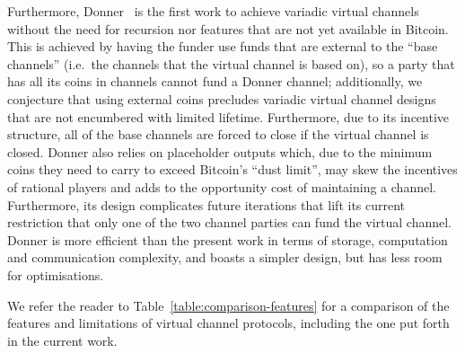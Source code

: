   Furthermore, Donner~\cite{donner} is the first work to achieve variadic
  virtual channels without the need for recursion nor features that are not yet
  available in Bitcoin. This is achieved by having the funder use funds that are
  external to the ``base channels'' (i.e.\ the channels that the virtual channel
  is based on), so a party that has all its coins in channels cannot fund a
  Donner channel; additionally, we conjecture that using external coins
  precludes variadic virtual channel designs that are not encumbered with
  limited lifetime. Furthermore, due to its incentive structure, all of the
  base channels are forced to close if the virtual channel is closed.
  Donner also relies on placeholder outputs
  which, due to the minimum coins they need to carry to exceed Bitcoin's ``dust
  limit'', may skew the incentives of rational players and adds to the
  opportunity cost of maintaining a channel. Furthermore, its design complicates
  future iterations that lift its current restriction that only one of the two
  channel parties can fund the virtual channel. Donner is more efficient than
  the present work in terms of storage, computation and communication
  complexity, and boasts a simpler design, but has less room for optimisations.

  We refer the reader to Table~\ref{table:comparison-features} for a comparison of the
  features and limitations of virtual channel protocols, including the one put
  forth in the current work.

